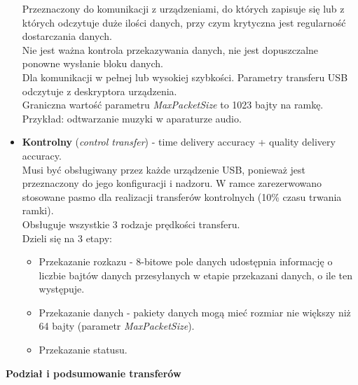 \begin{itemize}
			Przeznaczony do komunikacji z urządzeniami, do których zapisuje się lub z których odczytuje duże ilości danych, przy czym krytyczna jest regularność dostarczania danych.\\
			Nie jest ważna kontrola przekazywania danych, nie jest dopuszczalne ponowne wysłanie bloku danych.\\
			Dla komunikacji w pełnej lub wysokiej szybkości. Parametry transferu USB odczytuje z deskryptora urządzenia.\\
			Graniczna wartość parametru \emph{MaxPacketSize} to 1023 bajty na ramkę.\\
			Przykład: odtwarzanie muzyki w aparaturze audio.
			\item \textbf{Kontrolny} (\emph{control transfer}) - time delivery accuracy + quality delivery accuracy.\\
			Musi być obsługiwany przez każde urządzenie USB, ponieważ jest przeznaczony do jego konfiguracji i nadzoru. W ramce zarezerwowano stosowane pasmo dla realizacji transferów kontrolnych (10\% czasu trwania ramki).\\
			Obsługuje wszystkie 3 rodzaje prędkości transferu.\\
			Dzieli się na 3 etapy:
			\begin{itemize}
				\item Przekazanie rozkazu - 8-bitowe pole danych udostępnia informację o liczbie bajtów danych przesyłanych w etapie przekazani danych, o ile ten występuje.
				\item Przekazanie danych - pakiety danych mogą mieć rozmiar nie większy niż 64 bajty (parametr \emph{MaxPacketSize}).
				\item Przekazanie statusu.
			\end{itemize}
		\end{itemize}
		\newpage
		\textbf{Podział i podsumowanie transferów}
